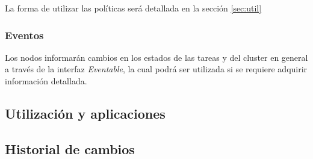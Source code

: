 \documentclass[12pt,a4paper,oneside,spanish]{report}
\begin{document}
La forma de utilizar las políticas será detallada en la sección \ref{sec:util}

\subsubsection*{Eventos}

Los nodos informarán cambios en los estados de las tareas y del cluster en general a través de la interfaz \textit{Eventable}, la cual podrá ser utilizada si se requiere adquirir información detallada.


\subsection*{Utilización y aplicaciones}
\label{sec:util}



\subsection*{Historial de cambios}
\end{document}
